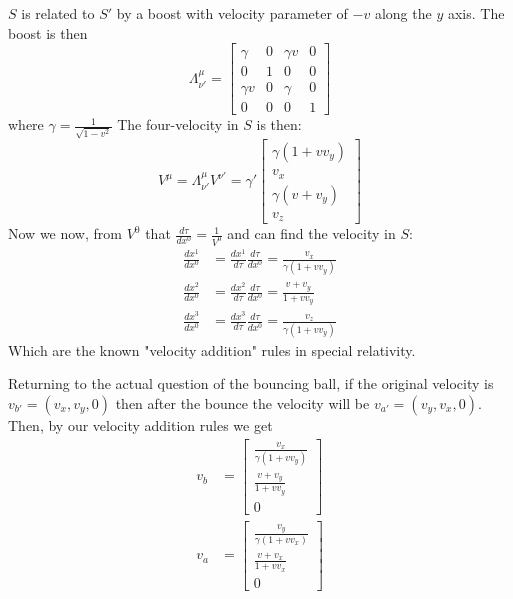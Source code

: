 $S$ is related to $S'$ by a boost with velocity parameter of $-v$ along the $y$ axis. The boost is then
\begin{equation}
    \Lambda^\mu_{\nu'} = \begin{bmatrix}
        \gamma & 0 & \gamma v & 0 \\
        0 & 1 & 0 & 0 \\
        \gamma v & 0 & \gamma & 0 \\
        0 & 0 & 0 & 1
    \end{bmatrix}
\end{equation}
where $\gamma=\frac{1}{\sqrt{1-v^2}}$ The four-velocity in $S$ is then:
\begin{equation}
    V^\mu = \Lambda^\mu_{\nu'}V^{\nu'} = \gamma'\begin{bmatrix}
        \gamma(1+vv_y) \\
        v_x \\
        \gamma (v+v_y) \\
        v_z
    \end{bmatrix}
\end{equation}
Now we now, from $V^0$ that $\frac{d\tau}{dx^0}=\frac{1}{V^0}$ and can find the velocity in $S$:
\begin{align}
    \frac{dx^1}{dx^0} &= \frac{dx^1}{d\tau}\frac{d\tau}{dx^0} = \frac{v_x}{\gamma (1+vv_y)} \\
    \frac{dx^2}{dx^0} &= \frac{dx^2}{d\tau}\frac{d\tau}{dx^0} = \frac{v+v_y}{1+vv_y} \\
    \frac{dx^3}{dx^0} &= \frac{dx^3}{d\tau}\frac{d\tau}{dx^0} = \frac{v_z}{\gamma (1+vv_y)}
\end{align}
Which are the known "velocity addition" rules in special relativity.

Returning to the actual question of the bouncing ball, if the original velocity is $v_{b'}=(v_x,v_y,0)$ then after the bounce the velocity will be $v_{a'}=(v_y,v_x,0)$. Then, by our velocity addition rules we get
\begin{align}
    v_b &= \begin{bmatrix}
        \frac{v_x}{\gamma (1+vv_y)} \\
        \frac{v+v_y}{1+vv_y} \\
        0
    \end{bmatrix} \\
    v_a &= \begin{bmatrix}
        \frac{v_y}{\gamma (1+vv_x)} \\
        \frac{v+v_x}{1+vv_x} \\
        0
    \end{bmatrix}
\end{align}
